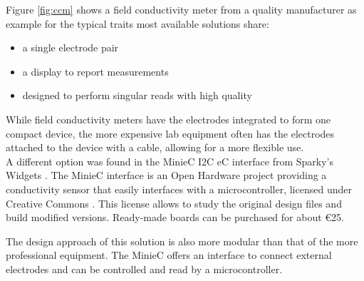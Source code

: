 Figure \ref{fig:ccm} shows a field conductivity meter from a quality manufacturer as example for the typical traits most available solutions share:
\begin{itemize}
	\item a single electrode pair
	\item a display to report measurements
	\item designed to perform singular reads with high quality
\end{itemize}

While field conductivity meters have the electrodes integrated to form one compact device, the more expensive lab equipment often has the electrodes attached to the device with a cable, allowing for a more flexible use. \\

A different option was found in the MinieC I2C eC interface from Sparky's Widgets \cite{uec}. The MinieC interface is an Open Hardware project providing a conductivity sensor that easily interfaces with a microcontroller, licensed under Creative Commons \cite{cc}. This license allows to study the original design files and build modified versions. Ready-made boards can be purchased for about \euro{25}.

The design approach of this solution is also more modular than that of the more professional equipment. The MinieC offers an interface to connect external electrodes and can be controlled and read by a microcontroller.
